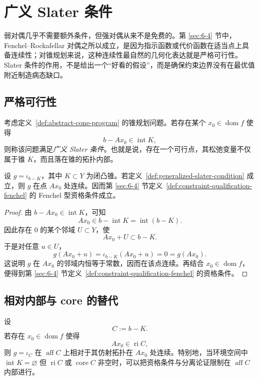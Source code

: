 \section{广义 Slater 条件}

\label{sec:7-3}

弱对偶几乎不需要额外条件，但强对偶从来不是免费的。第 \ref{sec:6-4} 节中，Fenchel--Rockafellar 对偶之所以成立，是因为指示函数或代价函数在适当点上具备连续性；对锥规划来说，这种连续性最自然的几何化表达就是严格可行性。Slater 条件的作用，不是给出一个“好看的假设”，而是确保约束边界没有在最优值附近制造病态缺口。

\subsection{严格可行性}

\begin{definition}[广义 Slater 条件]\label{def:generalized-slater-condition}
考虑定义~\ref{def:abstract-cone-program} 的锥规划问题。若存在某个 $x_0\in \operatorname{dom}f$ 使得
\[
b-Ax_0\in \operatorname{int}K,
\]
则称该问题满足\emph{广义 Slater 条件}。也就是说，存在一个可行点，其松弛变量不仅属于锥 $K$，而且落在锥的拓扑内部。
\end{definition}

\begin{proposition}\label{prop:slater-implies-fenchel-qualification}
设 $g=\iota_{b-K}$，其中 $K\subset Y$ 为闭凸锥。若定义~\ref{def:generalized-slater-condition} 成立，则 $g$ 在点 $Ax_0$ 处连续。因而第 \ref{sec:6-4} 节定义~\ref{def:constraint-qualification-fenchel} 的 Fenchel 型资格条件成立。
\end{proposition}

\begin{proof}
由 $b-Ax_0\in \operatorname{int}K$，可知
\[
Ax_0\in b-\operatorname{int}K=\operatorname{int}(b-K).
\]
因此存在 $0$ 的某个邻域 $U\subset Y$，使
\[
Ax_0+U\subset b-K.
\]
于是对任意 $u\in U$，
\[
g(Ax_0+u)=\iota_{b-K}(Ax_0+u)=0=g(Ax_0).
\]
这说明 $g$ 在 $Ax_0$ 的邻域内恒等于常数，因而在该点连续。再结合 $x_0\in\operatorname{dom}f$，便得到第 \ref{sec:6-4} 节定义~\ref{def:constraint-qualification-fenchel} 的资格条件。
\end{proof}

\subsection{相对内部与 core 的替代}

\begin{proposition}\label{prop:core-slater-variant}
设
\[
C:=b-K.
\]
若存在 $x_0\in \operatorname{dom}f$ 使得
\[
Ax_0\in \operatorname{ri} C,
\]
则 $g=\iota_C$ 在 $\operatorname{aff}C$ 上相对于其仿射拓扑在 $Ax_0$ 处连续。特别地，当环境空间中 $\operatorname{int}K=\varnothing$ 但 $\operatorname{ri}C$ 或 $\operatorname{core}C$ 非空时，可以把资格条件与分离论证限制在 $\operatorname{aff}C$ 内部进行。
\end{proposition}

